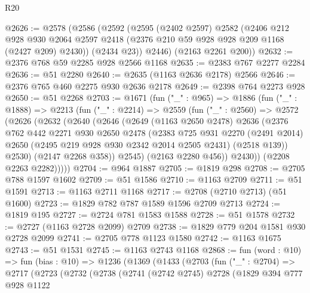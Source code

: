 \begin{lexlean}{R20}
\begin{coremodule}
@2626 := @2578
    (@2586
      (@2592
        (@2595
          (@2402 @2597)
          @2582
          (@2406
            @212
            @928
            @930
            @2064
            @2597
            @2418
            (@2376 @210 @59 @928 @928 @209 @1168 (@2427 @209) @2430))
          (@2434 @23))
        @2446)
      (@2163 @2261 @200))
@2632 := @2376 @768 @59 @2285 @928 @2566 @1168
@2635 := @2383 @767 @2277 @2284
@2636 := @51 @2280
@2640 := @2635 (@1163 @2636 @2178) @2566
@2646 := @2376 @765 @460 @2275 @930 @2636 @2178
@2649 := @2398 @764 @2273 @928
@2650 := @51 @2268
@2703 := @1671
    (fun ("_" : @965) =>
    @1886
      (fun ("_" : @1888) =>
      @2213
        (fun ("_" : @2214) =>
        @2559
          (fun ("_" : @2560) =>
          @2572
            (@2626
              (@2632
                (@2640
                  (@2646
                    (@2649
                      (@1163 @2650 @2478)
                      @2636
                      (@2376
                        @762
                        @442
                        @2271
                        @930
                        @2650
                        @2478
                        (@2383
                          @725
                          @931
                          @2270
                          (@2491 @2014)
                          @2650
                          (@2495 @219 @928 @930 @2342 @2014 @2505 @2431)
                          (@2518 @139))
                        @2530)
                      (@2147 @2268 @358))
                    @2545)
                  (@2163 @2280 @456))
                @2430))
            (@2208 @2263 @2282)))))
@2704 := @964 @1887
@2705 := @1819 @298
@2708 := @2705 @788 @1597 @1602
@2709 := @51 @1586
@2710 := @1163 @2709
@2711 := @51 @1591
@2713 := @1163 @2711 @1168
@2717 := @2708 (@2710 @2713) (@51 @1600)
@2723 := @1829 @782 @787 @1589 @1596 @2709 @2713
@2724 := @1819 @195
@2727 := @2724 @781 @1583 @1588
@2728 := @51 @1578
@2732 := @2727 (@1163 @2728 @2099) @2709
@2738 := @1829 @779 @204 @1581 @930 @2728 @2099
@2741 := @2705 @778 @1123 @1580
@2742 := @1163 @1675
@2743 := @51 @1531
@2745 := @1163 @2743 @1168
@2868 := fun (word : @10) =>
  fun (bias : @10) =>
  @1236
    (@1369
      (@1433
        (@2703
          (fun ("_" : @2704) =>
          @2717
            (@2723
              (@2732
                (@2738
                  (@2741
                    (@2742 @2745)
                    @2728
                    (@1829
                      @394
                      @777
                      @928
                      @1122

\end{coremodule}
\end{lexlean}
